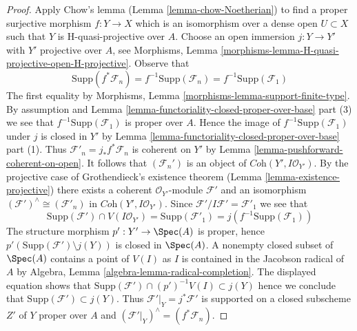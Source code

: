 \begin{proof}
\medskip\noindent
Apply Chow's lemma (Lemma \ref{lemma-chow-Noetherian}) to find a
proper surjective morphism $f : Y \to X$ which is an isomorphism
over a dense open $U \subset X$ such that $Y$ is H-quasi-projective
over $A$. Choose an open immersion $j : Y \to Y'$ with
$Y'$ projective over $A$, see
Morphisms, Lemma \ref{morphisms-lemma-H-quasi-projective-open-H-projective}.
Observe that
$$
\text{Supp}(f^*\mathcal{F}_n) = f^{-1}\text{Supp}(\mathcal{F}_n) =
f^{-1}\text{Supp}(\mathcal{F}_1)
$$
The first equality by
Morphisms, Lemma \ref{morphisms-lemma-support-finite-type}.
By assumption and
Lemma \ref{lemma-functoriality-closed-proper-over-base} part (3)
we see that $f^{-1}\text{Supp}(\mathcal{F}_1)$ is proper over $A$.
Hence the image of $f^{-1}\text{Supp}(\mathcal{F}_1)$
under $j$ is closed in $Y'$ by
Lemma \ref{lemma-functoriality-closed-proper-over-base} part (1).
Thus $\mathcal{F}'_n = j_*f^*\mathcal{F}_n$ is coherent on
$Y'$ by Lemma \ref{lemma-pushforward-coherent-on-open}.
It follows that $(\mathcal{F}_n')$
is an object of $\textit{Coh}(Y', I\mathcal{O}_{Y'})$.
By the projective case of Grothendieck's existence theorem
(Lemma \ref{lemma-existence-projective})
there exists a coherent $\mathcal{O}_{Y'}$-module
$\mathcal{F}'$ and an isomorphism
$(\mathcal{F}')^\wedge \cong (\mathcal{F}'_n)$ in
$\textit{Coh}(Y', I\mathcal{O}_{Y'})$.
Since $\mathcal{F}'/I\mathcal{F}' = \mathcal{F}'_1$ we see that
$$
\text{Supp}(\mathcal{F}') \cap V(I\mathcal{O}_{Y'}) =
\text{Supp}(\mathcal{F}'_1) = j(f^{-1}\text{Supp}(\mathcal{F}_1))
$$
The structure morphism $p' : Y' \to \Spec(A)$ is proper, hence
$p'(\text{Supp}(\mathcal{F}') \setminus j(Y))$
is closed in $\Spec(A)$. A nonempty closed subset of $\Spec(A)$
contains a point of $V(I)$ as $I$ is contained in the Jacobson radical
of $A$ by Algebra, Lemma \ref{algebra-lemma-radical-completion}.
The displayed equation shows that
$\text{Supp}(\mathcal{F}') \cap (p')^{-1}V(I) \subset j(Y)$
hence we conclude that $\text{Supp}(\mathcal{F}') \subset j(Y)$.
Thus $\mathcal{F}'|_Y = j^*\mathcal{F}'$
is supported on a closed subscheme $Z'$ of $Y$ proper over $A$
and $(\mathcal{F}'|_Y)^\wedge = (f^*\mathcal{F}_n)$.


\end{proof}
